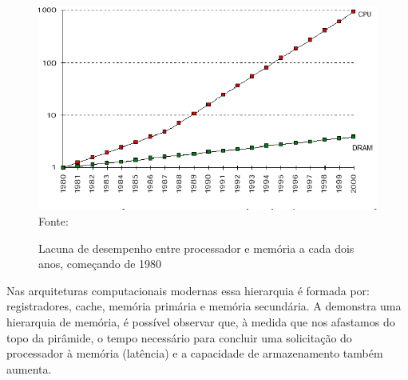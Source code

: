 \begin{figure}[h!]
    \centering
      \caption[Lacuna de desempenho entre processador e memória a cada dois anos, começando de 1980]{Lacuna de desempenho entre processador e memória a cada dois anos, começando de 1980}
      \includegraphics[scale=0.7]{images/gap-processor-memory.png}\\
      \footnotesize{Fonte: \cite{paper-gap-between-processor-memory}}
      \label{fig:processor-memory-performance-gap}
\end{figure} 

Nas arquiteturas computacionais modernas essa hierarquia é formada por: registradores, cache, memória primária e memória secundária. A   demonstra uma hierarquia de memória, é possível observar que, à medida que nos afastamos do topo da pirâmide, o tempo necessário para concluir uma solicitação do processador à memória (latência) e a capacidade de armazenamento também aumenta.

